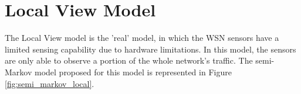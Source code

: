 \chapter{Local View Model} \label{chapter:local_view_model}
The Local View model is the 'real' model, in which the \acs{WSN} sensors have a limited sensing capability due to hardware limitations. In this model, the sensors are only able to observe a portion of the whole network's traffic. The semi-Markov model proposed for this model is represented in Figure \ref{fig:semi_markov_local}.
